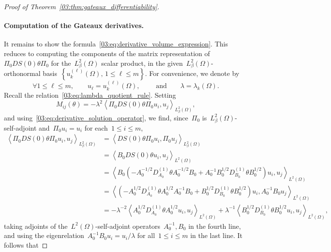 \begin{proof}[Proof of Theorem~\ref{03:thm:gateaux_differentiability}]
    \paragraph{Computation of the Gateaux derivatives.}
    It remains to show the formula~\eqref{03:eq:derivative_volume_expression}. This reduces to computing the components of the matrix representation of~$\Pi_0 D S(0) \theta \Pi_0$ for the~$L^2_\beta(\Omega)$ scalar product, in the given~$L^2_\beta(\Omega)$-orthonormal basis~$\left\{u_k^{(\ell)}(\Omega),\, 1\leq \ell \leq m\right\}$.
    For convenience, we denote by
    \[\forall 1\leq \ell\leq m,\qquad u_\ell = u_k^{(\ell)}(\Omega),\qquad\text{ and}\qquad \lambda = \lambda_k(\Omega).\]
    Recall the relation~\eqref{03:eq:lambda_quotient_rule}. Setting
    \begin{equation}
        M_{ij}(\theta) = -\lambda^2\left\langle \Pi_0 D S(0) \theta \Pi_0 u_i,u_j\right\rangle_{L^2_\beta(\Omega)},
    \end{equation}
    and using~\eqref{03:eq:derivative_solution_operator}, we find, since~$\Pi_0$ is~$L^2_\beta(\Omega)$-self-adjoint and~$\Pi_0 u_i = u_i$ for each~$1\leq i\leq m$,
    \begin{equation}
        \begin{aligned}
            \left\langle \Pi_0 D S(0) \theta \Pi_0 u_i,u_j\right\rangle_{L^2_\beta(\Omega)} &= \left\langle D S(0) \theta \Pi_0 u_i,\Pi_0 u_j\right\rangle_{L^2_\beta(\Omega)}\\
            &=\left\langle B_0 D S(0) \theta u_i,u_j\right\rangle_{L^2(\Omega)}\\
             &= \left\langle B_0\left( -A_0^{-1/2} D_{A_0}^{(1)}\theta A_0^{-1/2}B_0 + A_0^{-1}B_0^{1/2}D_{B_0}^{(1)}\theta B_0^{1/2}\right)u_i, u_j\right\rangle_{L^2(\Omega)}\\
            &= \left\langle \left(-A_0^{1/2}D_{A_0}^{(1)}\theta A_0^{1/2}A_0^{-1}B_0 + B_0^{1/2}D_{B_0}^{(1)}\theta B_0^{1/2}\right) u_i,A_0^{-1} B_0 u_j\right\rangle_{L^2(\Omega)}\\
            &= -\lambda^{-2}\left\langle A_0^{1/2}D_{A_0}^{(1)}\theta A_0^{1/2}u_i,u_j\right\rangle_{L^2(\Omega)} + \lambda^{-1}\left\langle B_0^{1/2}D_{B_0}^{(1)}\theta B_0^{1/2} u_i,u_j\right\rangle_{L^2(\Omega)},
        \end{aligned}
    \end{equation}
    taking adjoints of the~$L^2(\Omega)$-self-adjoint operators~$A_0^{-1},B_0$ in the fourth line, and using the eigenrelation~$A_0^{-1}B_0 u_i = u_i/\lambda$ for all~$1\leq i\leq m$ in the last line. It follows that

\end{proof}
